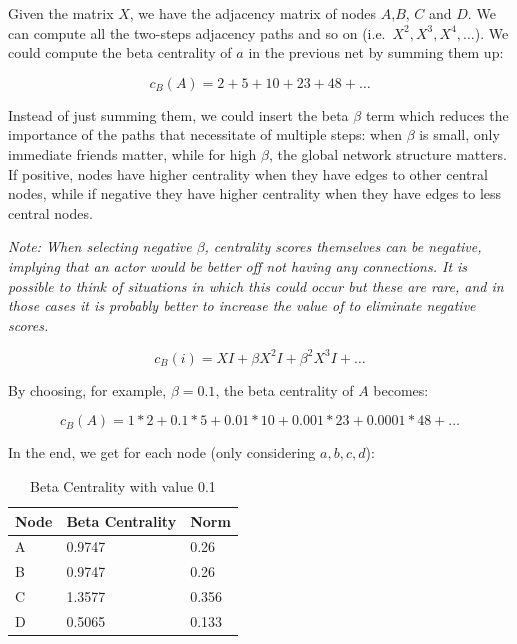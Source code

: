 \documentclass[
  notitlepage,
  onecolumn,
  openany]{book}
\begin{document}
Given the matrix \(X\), we have the adjacency matrix of nodes \(A\),\(B\), \(C\) and \(D\). We can compute all the two-steps adjacency paths and so on (i.e.~\(X^2, X^3, X^4,\dots\)). We could compute the beta centrality of \(a\) in the previous net by summing them up:

\[
c_B(A) = 2+5+10+23+48+\dots
\]

Instead of just summing them, we could insert the beta \(\beta\) term which reduces the importance of the paths that necessitate of multiple steps: when \(\beta\) is small, only immediate friends matter, while for high \(\beta\), the global network structure matters. If positive, nodes have higher centrality when they have edges to other central nodes, while if negative they have higher centrality when they have edges to less central nodes.

\emph{Note: When selecting negative \(\beta\), centrality scores themselves can be negative, implying that an actor would be better off not having any connections. It is possible to think of situations in which this could occur but these are rare, and in those cases it is probably better to increase the value of \beta to eliminate negative scores.}

\[
c_B(i) = XI+\beta X^2I+\beta^2X^3I+\dots
\]

By choosing, for example, \(\beta = 0.1\), the beta centrality of \(A\) becomes:

\[
c_B(A) = 1*2+0.1*5+0.01*10+0.001*23+0.0001*48+\dots
\]

In the end, we get for each node (only considering \(a,b,c,d\)):

\begin{table}[h]
\centering
\begin{tabular}{@{}lll@{}}
\toprule
\textbf{Node} & \textbf{Beta Centrality} & \textbf{Norm} \\ \midrule
A             & 0.9747                   & 0.26          \\
B             & 0.9747                   & 0.26          \\
C             & 1.3577                   & 0.356         \\
D             & 0.5065                   & 0.133         \\ \bottomrule
\end{tabular}
\caption{Beta Centrality with \beta value 0.1}
\label{tab:my-table}
\end{table}
\end{document}

